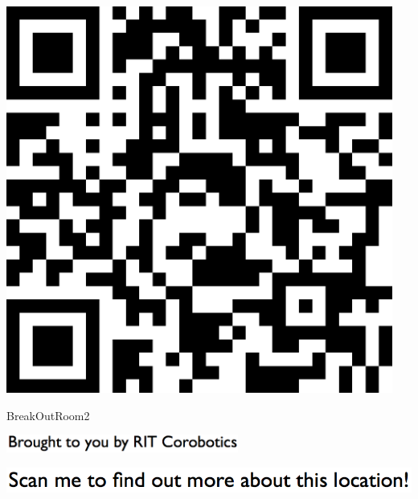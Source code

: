 \documentclass[letterpaper]{article}
\begin{document}
 \vspace{0.5in} 
 
 \begingroup 
 \centerline{\includegraphics[scale=1,width=5in,height=5in]{BreakOutRoom2.png}} 
 \endgroup 
 \vspace*{\fill} 

 \hfill{\small BreakOutRoom2} 

  \vspace{0.7in} 
 
 \centerline{\includegraphics[scale=1,width=3in]{text-bottom.png}} 
 
 \pagebreak 
{} 
 \vspace*{\fill} 
 
  \centerline{\includegraphics[scale=1,width=6in]{text-top.png}} 
 
 \vspace{0.5in} 
 
\end{document}
